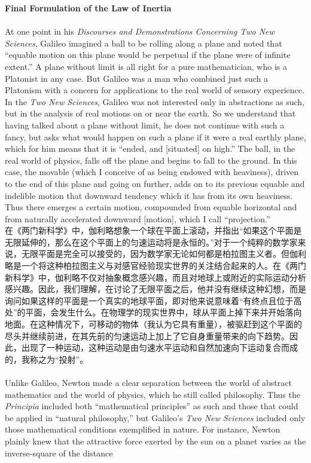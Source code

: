 \documentclass{article}
\begin{document}
\noindent\textbf{Final Formulation of the Law of Inertia}\\
\\
At one point in his \textit{Discourses and Demonstrations Concerning Two New Sciences}, Galileo imagined a ball to be rolling along a plane and noted that ``equable motion on this plane would be perpetual if the plane were of infinite extent.'' A plane without limit is all right for a pure mathematician, who is a Platonist in any case. But Galileo was a man who combined just such a Platonism with a concern for applications to the real world of sensory experience. In the \textit{Two New Sciences}, Galileo was not interested only in abstractions as such, but in the analysis of real motions on or near the earth. So we understand that having talked about a plane without limit, he does not continue with such a fancy, but asks what would happen on such a plane if it were a real earthly plane, which for him means that it is ``ended, and [situated] on high.'' The ball, in the real world of physics, falls off the plane and begins to fall to the ground. In this case, the movable (which I conceive of as being endowed with heaviness), driven to the end of this plane and going on further, adds on to its previous equable and indelible motion that downward tendency which it has from its own heaviness. Thus there emerges a certain motion, compounded from equable horizontal and from naturally accelerated downward [motion], which I call ``projection.''\\
在《两门新科学》中，伽利略想象一个球在平面上滚动，并指出“如果这个平面是无限延伸的，那么在这个平面上的匀速运动将是永恒的。”对于一个纯粹的数学家来说，无限平面是完全可以接受的，因为数学家无论如何都是柏拉图主义者。但伽利略是一个将这种柏拉图主义与对感官经验现实世界的关注结合起来的人。在《两门新科学》中，伽利略不仅对抽象概念感兴趣，而且对地球上或附近的实际运动分析感兴趣。因此，我们理解，在讨论了无限平面之后，他并没有继续这种幻想，而是询问如果这样的平面是一个真实的地球平面，即对他来说意味着“有终点且位于高处”的平面，会发生什么。在物理学的现实世界中，球从平面上掉下来并开始落向地面。在这种情况下，可移动的物体（我认为它具有重量），被驱赶到这个平面的尽头并继续前进，在其先前的匀速运动上加上了它自身重量带来的向下趋势。因此，出现了一种运动，这种运动是由匀速水平运动和自然加速向下运动复合而成的，我称之为“投射”。\\

\\
Unlike Galileo, Newton made a clear separation between the world of abstract mathematics and the world of physics, which he still called philosophy. Thus the \textit{Principia} included both ``mathematical principles'' as such and those that could be applied in ``natural philosophy,'' but Galileo's \textit{Two New Sciences} included only those mathematical conditions exemplified in nature. For instance, Newton plainly knew that the attractive force exerted by the sun on a planet varies as the inverse-square of the distance
\end{document}
